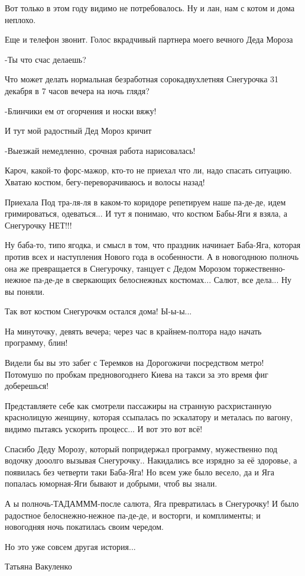 Вот только в этом году видимо не потребовалось. Ну и лан, нам с котом и дома
неплохо.

Еще и телефон звонит. Голос вкрадчивый партнера моего вечного Деда Мороза

-Ты что счас делаешь?

Что может делать нормальная безработная сорокадвухлетняя Снегурочка 31 декабря
в 7 часов вечера на ночь глядя?

-Блинчики ем от огорчения и носки вяжу!

И тут мой радостный Дед Мороз кричит

-Выезжай немедленно, срочная работа нарисовалась!

Кароч, какой-то форс-мажор, кто-то не приехал что ли, надо спасать ситуацию. Хватаю
костюм, бегу-переворачиваюсь и волосы назад!

Приехала Под тра-ля-ля в каком-то коридоре репетируем наше па-де-де, идем
гримироваться, одеваться... И тут я понимаю, что костюм Бабы-Яги я взяла, а
Снегурочку НЕТ!!!

Ну баба-то, типо ягодка, и смысл в том, что праздник начинает Баба-Яга, которая
против всех и наступления Нового года в особенности. А в новогоднюю полночь она
же превращается в Снегурочку, танцует с Дедом Морозом торжественно-нежное
па-де-де в сверкающих белоснежных костюмах... Салют, все дела... Ну вы поняли.

Так вот костюм Снегурочкм остался дома! Ы-ы-ы...

На минуточку, девять вечера; через час в крайнем-полтора надо начать
программу, блин!

Видели бы вы это забег с Теремков на Дорогожичи посредством метро! Потомушо по
пробкам предновогоднего Киева на такси за это время фиг доберешься!

Представляете себе как смотрели пассажиры на странную расхристанную краснолицую
женщину, которая ссыпалась по эскалатору и металась по вагону, видимо пытаясь
ускорить процесс... И вот это вот всё!

Спасибо Деду Морозу, который попридержал программу, мужественно под водочку
дооолго вызывая Снегурочку.. Накидались все изрядно за её здоровье, а появилась
без четверти таки Баба-Яга! Но всем уже было весело, да и Яга попалась
юморная-Яги бывают и добрыми, чтоб вы знали.

А ы полночь-ТАДАМММ-после салюта, Яга превратилась в Снегурочку! И было радостное
белоснежно-нежное па-де-де, и восторги, и комплименты; и новогодняя ночь
покатилась своим чередом.

Но это  уже совсем другая история...

Татьяна Вакуленко

